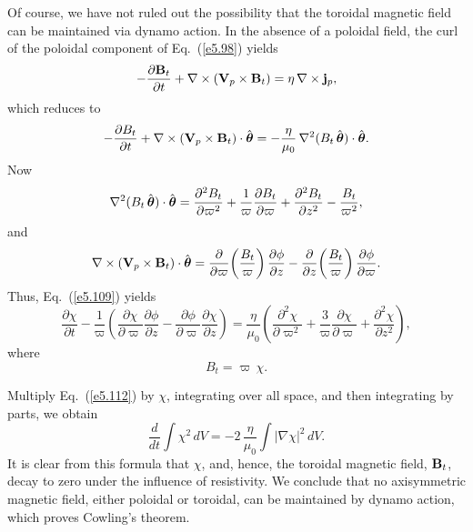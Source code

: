 Of course, we have not ruled out the possibility that the toroidal magnetic
field can be maintained via dynamo action. In the absence of a poloidal
field, the curl of the poloidal component of Eq.~(\ref{e5.98}) yields
\begin{equation}
-\frac{\partial {\bf B}_t}{\partial t} +\nabla\times({\bf V}_p\times
{\bf B}_t) = \eta\,\nabla\times {\bf j}_p,
\end{equation}
which reduces to
\begin{equation}\label{e5.109}
-\frac{\partial B_t}{\partial t} +
\nabla\times({\bf V}_p\times {\bf B}_t) 
\cdot\hat{\mbox{\boldmath$\theta$}}=-
\frac{\eta}{\mu_0}\,\nabla^2(B_t\,\hat{\mbox{\boldmath$\theta$}})\cdot\hat{\mbox{\boldmath$\theta$}}.
\end{equation}
Now
\begin{equation}
\nabla^2(B_t\,\hat{\mbox{\boldmath$\theta$}})\cdot\hat{\mbox{\boldmath$\theta$}}
=\frac{\partial^2 B_t}{\partial\varpi^2} +\frac{1}{\varpi}
\frac{\partial B_t}{\partial\varpi} + \frac{\partial^2 B_t}{\partial z^2}
-\frac{B_t}{\varpi^2},
\end{equation}
and
\begin{equation}
\nabla\times({\bf V}_p\times {\bf B}_t)
\cdot\hat{\mbox{\boldmath$\theta$}}=
\frac{\partial}{\partial\varpi}\!\left(\frac{B_t}{\varpi}\right)
\frac{\partial\phi}{\partial z} -\frac{\partial}{\partial z}\!
\left(\frac{B_t}{\varpi}\right) \frac{\partial\phi}{\partial\varpi}.
\end{equation}
Thus, Eq.~(\ref{e5.109}) yields
\begin{equation}\label{e5.112}
\frac{\partial\chi}{\partial t} -\frac{1}{\varpi}\left(\frac{\partial\chi}{\partial\varpi}
\frac{\partial\phi}{\partial z} -\frac{\partial
\phi}{\partial \varpi}\frac{\partial\chi}{\partial z}\right)=\frac{\eta}{\mu_0}\left(
\frac{\partial^2\chi}{\partial\varpi^2} +\frac{3}{\varpi}\frac{\partial\chi}
{\partial\varpi} +\frac{\partial^2\chi}{\partial z^2}\right),
\end{equation}
where 
\begin{equation}
B_t = \varpi\,\chi.
\end{equation}

Multiply  Eq.~(\ref{e5.112}) by $\chi$, integrating over all space, and
then integrating by parts, we obtain
\begin{equation}
\frac{d}{dt}\!\int\chi^2\,dV = -2\,\frac{\eta}{\mu_0}\int|\nabla\chi|^2\,dV.
\end{equation}
It is clear from this formula that $\chi$, and, hence, the toroidal magnetic
field, ${\bf B}_t$, decay to zero under the influence of resistivity.
We conclude that no axisymmetric magnetic field, either poloidal
or toroidal, can be maintained by
dynamo action, which proves Cowling's theorem.

